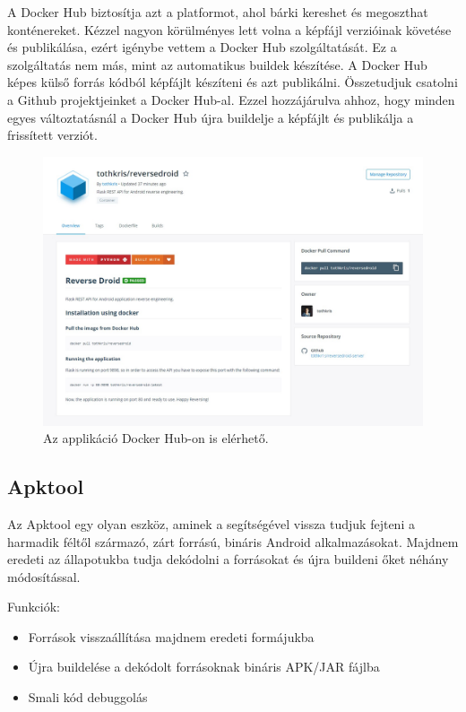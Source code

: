 \documentclass{thesis-ekf}
\theoremstyle{definition}
\theoremstyle{remark}
\begin{document}
A Docker Hub biztosítja azt a platformot, ahol bárki kereshet és megoszthat konténereket.
Kézzel nagyon körülményes lett volna a képfájl verzióinak követése és publikálása, ezért igénybe vettem a Docker Hub szolgáltatását.
Ez a szolgáltatás nem más, mint az automatikus buildek készítése.
A Docker Hub képes külső forrás kódból képfájlt készíteni és azt publikálni.
Összetudjuk csatolni a Github projektjeinket a Docker Hub-al. 
Ezzel hozzájárulva ahhoz, hogy minden egyes változtatásnál a Docker Hub újra buildelje a képfájlt és publikálja a frissített verziót.

\begin{figure}[!h]
	\centering
	\includegraphics[width=15cm]{pictures/docker_hub}
	\caption{Az applikáció Docker Hub-on is elérhető.}
	\label{dockerhub}
\end{figure}

\subsection{Apktool}

Az Apktool egy olyan eszköz, aminek a segítségével vissza tudjuk fejteni a harmadik féltől származó, zárt forrású, bináris Android alkalmazásokat.
Majdnem eredeti az állapotukba tudja dekódolni a forrásokat és újra buildeni őket néhány módosítással.

Funkciók:

\begin{itemize}
	\item Források visszaállítása majdnem eredeti formájukba
	\item Újra buildelése a dekódolt forrásoknak bináris APK/JAR fájlba
	\item Smali kód debuggolás
\end{itemize}
\end{document}

